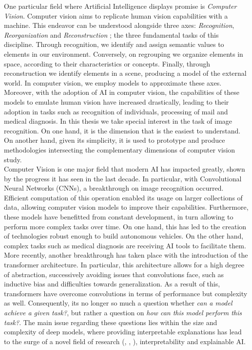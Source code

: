 \noindent One particular field where Artificial Intelligence displays promise is \emph{Computer 
Vision}. Computer vision aims to replicate human vision capabilities with a machine. This endeavor 
can be understood alongside three axes: \emph{Recognition}, \emph{Reorganization} and 
\emph{Reconstruction} \autocite{malik2016three}; the three fundamental tasks of this discipline.
Through recognition, we identify and assign semantic values to elements in our environment. 
Conversely, on regrouping we organize elements in space, according to their characteristics or 
concepts. Finally, through reconstruction we identify elements in a scene, producing 
a model of the external world. In computer vision, we employ models to approximate these axes. 
Moreover, with the adoption of AI in computer vision, the capabilities of these models to emulate 
human vision have increased drastically, leading to their adoption in tasks such as recognition of 
individuals, processing of mail and medical diagnosis. In this thesis we  take special interest in 
the task of image recognition. On one hand, it is the dimension that is the easiest to understand. 
On another hand, given its simplicity, it is used to prototype and produce methodologies 
intersecting the complementary dimensions of computer vision study.\\

\noindent Computer Vision is one major field that modern AI has impacted greatly, shown by the 
progress it has seen in the last decade. In particular, with Convolutional Neural Networks (CNNs), a 
breakthrough on image recognition occurred. Efficient computation of this 
operation enabled its usage on larger collections of data, allowing computer vision models to 
improve their capabilities. Furthermore, these models have benefitted from constant development, in 
turn allowing to perform more complex tasks over time. On one hand, this has led to the creation 
of technologies robust enough to build autonomous vehicles. On the other hand, complex tasks such  
as medical diagnosis are receiving AI tools to facilitate them. More recently, another 
breakthrough has taken place with the introduction of the transformer architecture. 
In particular, this architecture allows for a high degree of abstraction, successively avoiding 
issues that convolutions face, such as inductive bias and difficulties towards generalization. As a 
result of this, transformers have overcome convolutions in terms of performance but complexity as 
well. Consequently, its no longer so much a question whether \textit{can a model achieve a given 
task?}, but rather a question on \textit{how can this model perform this task?}. The main 
issue regarding these questions lies within the size and complexity of deep models, where 
providing interpretable explanations has lead to the surge of a novel field of research 
(\cite{li2018deep}, \cite{guidotti2018survey}, \cite{bodria2021benchmarking}), interpretability 
and explainable AI.\\

